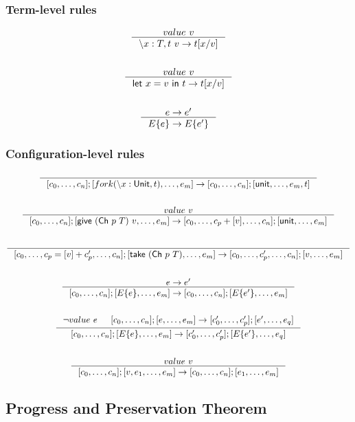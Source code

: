 \documentclass{article}
\newcommand{\sco}[1]{\textsf{#1}}
\newcommand{\lam}[3]{\backslash #1 : #2, #3}
\newcommand{\unit}{\sco{unit}}
\newcommand{\letin}[3]{\sco{let } #1 = #2 \sco{ in } #3}
\newcommand{\give}[2]{\sco{give } #1\ #2}
\newcommand{\take}[1]{\sco{take } #1}
\newcommand{\channel}[2]{\sco{Ch }#1\ #2}
\newcommand{\Unit}{\sco{Unit}}
\begin{document}
\subsubsection{Term-level rules}

\begin{gather*}
    \inference{
        value\ v
    }{
        \lam{x}{T}{t}\ v -> t[x/v]
    }\\
    \\
    \inference{
        value\ v
    }{
        \letin{x}{v}{t} -> t[x/v]
    }\\
    \\
    \inference{
        e -> e'
    }{
        E\{e\} -> E\{e'\}
    }
\end{gather*}

\subsubsection{Configuration-level rules}

\begin{gather*}
    \inference{}{
        [c_0,\dots,c_n];[fork (\lam{x}{\Unit}{t}),\dots,e_m] -> [c_0,\dots,c_n];[\unit,\dots,e_m,t]
    }\\
    \\
    \inference{
        value\ v
    }{
        [c_0,\dots,c_n];[\give{(\channel{p}{T})}{v},\dots,e_m] ->
        [c_0,\dots,c_p + [v],\dots,c_n];[\unit,\dots,e_m]
    }\\
    \\
    \inference{}{
        [c_0,\dots,c_p = [v]+c_p',\dots,c_n];[\take{(\channel{p}{T})},\dots,e_m] ->
        [c_0,\dots,c_p',\dots,c_n];[v,\dots,e_m]
    }\\
    \\
    \inference{
        e -> e'
    }{
        [c_0,\dots,c_n];[E\{e\},\dots,e_m] ->
        [c_0,\dots,c_n];[E\{e'\},\dots,e_m]
    }\\
    \\
    \inference{
        \lnot value\ e &
        [c_0,\dots,c_n];[e,\dots,e_m] ->
        [c_0',\dots,c_p'];[e',\dots,e_q]
    }{
        [c_0,\dots,c_n];[E\{e\},\dots,e_m] ->
        [c_0',\dots,c_p'];[E\{e'\},\dots,e_q]
    }\\
    \\
    \inference{
        value\ v
    }{
        [c_0,\dots,c_n];[v,e_1,\dots,e_m] ->
        [c_0,\dots,c_n];[e_1,\dots,e_m]
    }
\end{gather*}

\subsection{Progress and Preservation Theorem}
\end{document}
